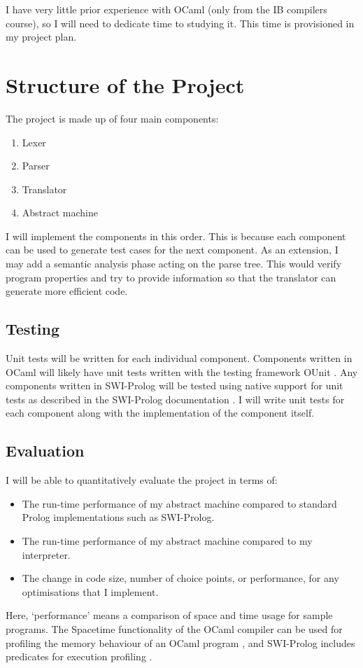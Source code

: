 \documentclass[12pt, a4paper]{article}
\begin{document}
I have very little prior experience with OCaml (only from the IB compilers course), so I will need to dedicate time to studying it. This time is provisioned in my project plan.

\section*{Structure of the Project}

The project is made up of four main components:
\begin{enumerate}
\item Lexer
\item Parser
\item Translator
\item Abstract machine
\end{enumerate}

I will implement the components in this order. This is because each component can be used to generate test cases for the next component. As an extension, I may add a semantic analysis phase acting on the parse tree. This would verify program properties and try to provide information so that the translator can generate more efficient code.

\subsection*{Testing}

Unit tests will be written for each individual component. Components written in OCaml will likely have unit tests written with the testing framework OUnit \cite{OUnit}. Any components written in SWI-Prolog will be tested using native support for unit tests as described in the SWI-Prolog documentation \cite{PUnit}. I will write unit tests for each component along with the implementation of the component itself.
   
\subsection*{Evaluation}
   
I will be able to quantitatively evaluate the project in terms of:
\begin{itemize}
\item The run-time performance of my abstract machine compared to standard Prolog implementations such as SWI-Prolog.
\item The run-time performance of my abstract machine compared to my interpreter.
\item The change in code size, number of choice points, or performance, for any optimisations that I implement.
\end{itemize}
Here, `performance' means a comparison of space and time usage for sample programs. The Spacetime functionality of the OCaml compiler can be used for profiling the memory behaviour of an OCaml program \cite{SpaceT}, and SWI-Prolog includes predicates for execution profiling \cite{PExec}.
\end{document}
